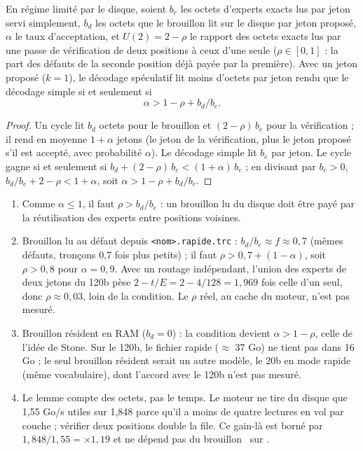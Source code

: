 \begin{lemme}\label{t3syn:lem:b2}
En régime limité par le disque, soient $b_e$ les octets d'experts exacts lus par jeton servi simplement, $b_d$ les octets que le brouillon lit sur le disque par jeton proposé, $\alpha$ le taux d'acceptation, et $U(2) = 2 - \rho$ le rapport des octets exacts lus par une passe de vérification de deux positions à ceux d'une seule ($\rho \in [0, 1]$ : la part des défauts de la seconde position déjà payée par la première). Avec un jeton proposé ($k = 1$), le décodage spéculatif lit moins d'octets par jeton rendu que le décodage simple si et seulement si
\begin{equation}\label{t3syn:eq:b2}
\alpha > 1 - \rho + b_d/b_e.
\end{equation}
\end{lemme}

\begin{proof}
Un cycle lit $b_d$ octets pour le brouillon et $(2 - \rho)\,b_e$ pour la vérification ; il rend en moyenne $1 + \alpha$ jetons (le jeton de la vérification, plus le jeton proposé s'il est accepté, avec probabilité $\alpha$). Le décodage simple lit $b_e$ par jeton. Le cycle gagne si et seulement si $b_d + (2 - \rho)\,b_e < (1 + \alpha)\,b_e$ ; en divisant par $b_e > 0$, $b_d/b_e + 2 - \rho < 1 + \alpha$, soit $\alpha > 1 - \rho + b_d/b_e$.
\end{proof}

\begin{corollaire}\label{t3syn:cor:b2}
\begin{enumerate}[label=(\roman*)]
\item Comme $\alpha \le 1$, il faut $\rho > b_d/b_e$ : un brouillon lu du disque doit être payé par la réutilisation des experts entre positions voisines.
\item Brouillon lu au défaut depuis \texttt{<nom>.rapide.trc} : $b_d/b_e \approx f \approx 0{,}7$ (mêmes défauts, tronçons 0,7 fois plus petits) ; il faut $\rho > 0{,}7 + (1 - \alpha)$, soit $\rho > 0{,}8$ pour $\alpha = 0{,}9$. Avec un routage indépendant, l'union des experts de deux jetons du 120b pèse $2 - t/E = 2 - 4/128 = 1{,}969$ fois celle d'un seul, donc $\rho \approx 0{,}03$, loin de la condition. Le $\rho$ réel, au cache du moteur, n'est pas mesuré.
\item Brouillon résident en RAM ($b_d = 0$) : la condition devient $\alpha > 1 - \rho$, celle de l'idée de Stone. Sur le 120b, le fichier rapide ($\approx$ 37 Go) ne tient pas dans 16 Go ; le seul brouillon résident serait un autre modèle, le 20b en mode rapide (même vocabulaire), dont l'accord avec le 120b n'est pas mesuré.
\item Le lemme compte des octets, pas le temps. Le moteur ne tire du disque que 1,55 Go/s utiles sur 1,848 parce qu'il a moins de quatre lectures en vol par couche ; vérifier deux positions double la file. Ce gain-là est borné par $1{,}848/1{,}55 = \times 1{,}19$ et ne dépend pas du brouillon \calc~sur \mes.
\end{enumerate}
\end{corollaire}

